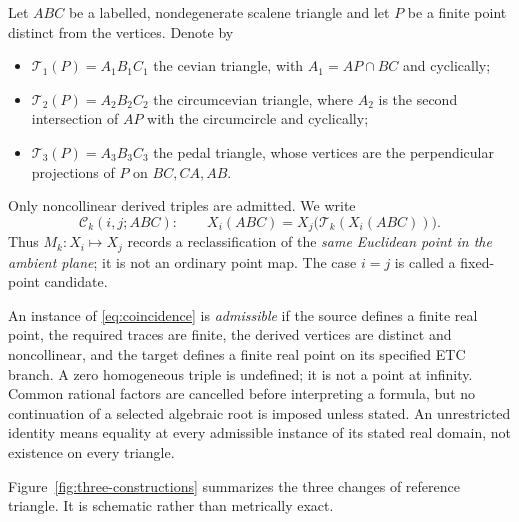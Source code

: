 \documentclass[11pt]{article}
\newcommand{\Cev}{\mathcal T_1}
\newcommand{\Circ}{\mathcal T_2}
\newcommand{\Ped}{\mathcal T_3}
\begin{document}
Let $ABC$ be a labelled, nondegenerate scalene triangle and let $P$ be a
finite point distinct from the vertices.  Denote by
\begin{itemize}
\item $\Cev(P)=A_1B_1C_1$ the cevian triangle, with
  $A_1=AP\cap BC$ and cyclically;
\item $\Circ(P)=A_2B_2C_2$ the circumcevian triangle, where $A_2$ is the
  second intersection of $AP$ with the circumcircle and cyclically;
\item $\Ped(P)=A_3B_3C_3$ the pedal triangle, whose vertices are the
  perpendicular projections of $P$ on $BC,CA,AB$.
\end{itemize}
Only noncollinear derived triples are admitted.  We write
\begin{equation}\label{eq:coincidence}
 \mathcal C_k(i,j;ABC):\qquad
 X_i(ABC)=X_j\bigl(\mathcal T_k(X_i(ABC))\bigr).
\end{equation}
Thus $M_k:X_i\mapsto X_j$ records a reclassification of the \emph{same
Euclidean point in the ambient plane}; it is not an ordinary point map.
The case $i=j$ is called a fixed-point candidate.

An instance of \eqref{eq:coincidence} is \emph{admissible} if the source
defines a finite real point, the required traces are finite, the derived
vertices are distinct and noncollinear, and the target defines a finite
real point on its specified ETC branch.  A zero homogeneous triple is
undefined; it is not a point at infinity.  Common rational factors are
cancelled before interpreting a formula, but no continuation of a selected
algebraic root is imposed unless stated.  An unrestricted identity means
equality at every admissible instance of its stated real domain, not
existence on every triangle.

Figure~\ref{fig:three-constructions} summarizes the three changes of
reference triangle.  It is schematic rather than metrically exact.
\end{document}
